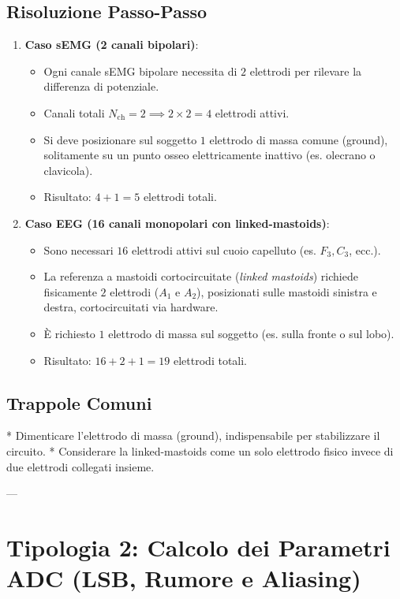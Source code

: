 \documentclass[10pt, letterpaper]{report}
\begin{document}
\subsection*{Risoluzione Passo-Passo}
\begin{enumerate}
    \item \textbf{Caso sEMG (2 canali bipolari)}:
    \begin{itemize}
        \item Ogni canale sEMG bipolare necessita di $2$ elettrodi per rilevare la differenza di potenziale.
        \item Canali totali $N_{\text{ch}} = 2 \implies 2 \times 2 = 4$ elettrodi attivi.
        \item Si deve posizionare sul soggetto $1$ elettrodo di massa comune (ground), solitamente su un punto osseo elettricamente inattivo (es. olecrano o clavicola).
        \item Risultato: $4 + 1 = 5$ elettrodi totali.
    \end{itemize}
    \item \textbf{Caso EEG (16 canali monopolari con linked-mastoids)}:
    \begin{itemize}
        \item Sono necessari $16$ elettrodi attivi sul cuoio capelluto (es. $F_3, C_3$, ecc.).
        \item La referenza a mastoidi cortocircuitate (\emph{linked mastoids}) richiede fisicamente $2$ elettrodi ($A_1$ e $A_2$), posizionati sulle mastoidi sinistra e destra, cortocircuitati via hardware.
        \item È richiesto $1$ elettrodo di massa sul soggetto (es. sulla fronte o sul lobo).
        \item Risultato: $16 + 2 + 1 = 19$ elettrodi totali.
    \end{itemize}
\end{enumerate}

\subsection*{Trappole Comuni}
* Dimenticare l'elettrodo di massa (ground), indispensabile per stabilizzare il circuito.
* Considerare la linked-mastoids come un solo elettrodo fisico invece di due elettrodi collegati insieme.

---

\section{Tipologia 2: Calcolo dei Parametri ADC (LSB, Rumore e Aliasing)}
\end{document}
